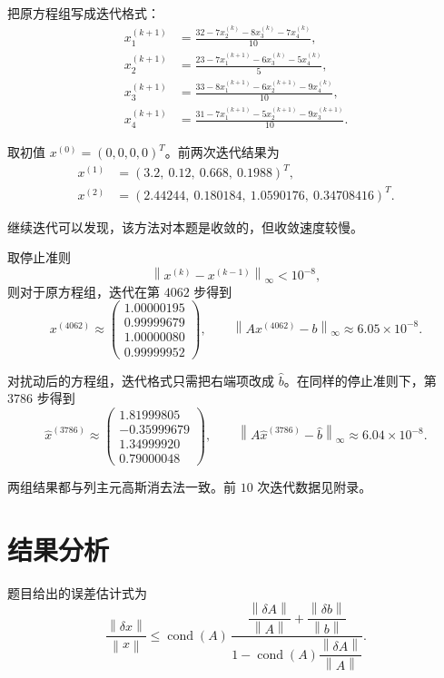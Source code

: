 \documentclass[12pt,a4paper]{ctexart}
\newcommand{\norm}[1]{\left\lVert #1 \right\rVert}
\begin{document}
把原方程组写成迭代格式：
\begin{align*}
x_1^{(k+1)}&=\frac{32-7x_2^{(k)}-8x_3^{(k)}-7x_4^{(k)}}{10},\\
x_2^{(k+1)}&=\frac{23-7x_1^{(k+1)}-6x_3^{(k)}-5x_4^{(k)}}{5},\\
x_3^{(k+1)}&=\frac{33-8x_1^{(k+1)}-6x_2^{(k+1)}-9x_4^{(k)}}{10},\\
x_4^{(k+1)}&=\frac{31-7x_1^{(k+1)}-5x_2^{(k+1)}-9x_3^{(k+1)}}{10}.
\end{align*}

取初值 $x^{(0)}=(0,0,0,0)^T$。前两次迭代结果为
\begin{align*}
x^{(1)}&=(3.2,\ 0.12,\ 0.668,\ 0.1988)^T,\\
x^{(2)}&=(2.44244,\ 0.180184,\ 1.0590176,\ 0.34708416)^T.
\end{align*}

继续迭代可以发现，该方法对本题是收敛的，但收敛速度较慢。

取停止准则
\[
\norm{x^{(k)}-x^{(k-1)}}_{\infty}<10^{-8},
\]
则对于原方程组，迭代在第 $4062$ 步得到
\[
x^{(4062)}\approx
\begin{pmatrix}
1.00000195\\
0.99999679\\
1.00000080\\
0.99999952
\end{pmatrix},
\qquad
\norm{Ax^{(4062)}-b}_{\infty}\approx 6.05\times 10^{-8}.
\]

对扰动后的方程组，迭代格式只需把右端项改成 $\hat{b}$。在同样的停止准则下，第 $3786$ 步得到
\[
\hat{x}^{(3786)}\approx
\begin{pmatrix}
1.81999805\\
-0.35999679\\
1.34999920\\
0.79000048
\end{pmatrix},
\qquad
\norm{A\hat{x}^{(3786)}-\hat{b}}_{\infty}\approx 6.04\times 10^{-8}.
\]

两组结果都与列主元高斯消去法一致。前 $10$ 次迭代数据见附录。

\section{结果分析}

题目给出的误差估计式为
\[
\frac{\norm{\delta x}}{\norm{x}}
\le
\operatorname{cond}(A)\,
\frac{\dfrac{\norm{\delta A}}{\norm{A}}+\dfrac{\norm{\delta b}}{\norm{b}}}{1-\operatorname{cond}(A)\dfrac{\norm{\delta A}}{\norm{A}}}.
\]
\end{document}
